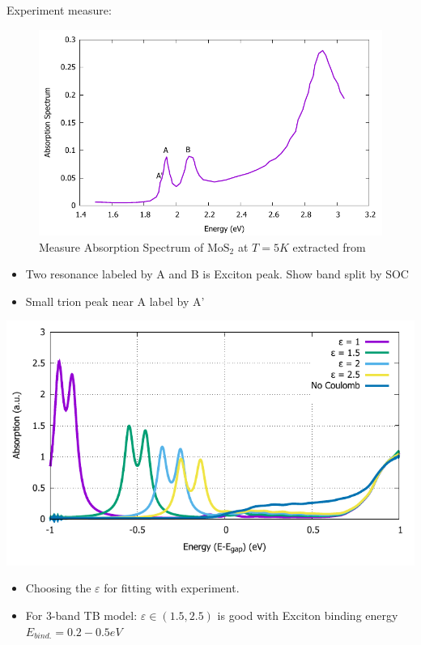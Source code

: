 \documentclass{beamer}
\begin{document}
	\begin{frame}
		Experiment measure:
		\begin{multicols}{2}
		\begin{figure}
	\includegraphics[width = 1\linewidth]{images/Experiment.pdf}
	\caption{Measure Absorption Spectrum of $\mathrm{MoS}_2$ at $T=5K$  extracted from \cite{zhang_absorption_2014}}
	\end{figure}
	\columnbreak
	\begin{itemize}
		\item Two resonance labeled by A and B is Exciton peak. Show band split by SOC
		\item Small trion peak near A label by A'
	\end{itemize}
	\end{multicols}
	\end{frame}
	\begin{frame}
		\begin{multicols}{2}
			
			\includegraphics[width=1\linewidth]{images/varyepsilon.pdf}
			\columnbreak
			\begin{itemize}
				\item Choosing the $\varepsilon$ for fitting with experiment.
				\item For 3-band TB model: $\varepsilon \in (1.5,2.5)$ is good with Exciton binding energy $E_{bind.}= 0.2-0.5 eV$ 
			\end{itemize}
		\end{multicols}
	\end{frame}
\end{document}
